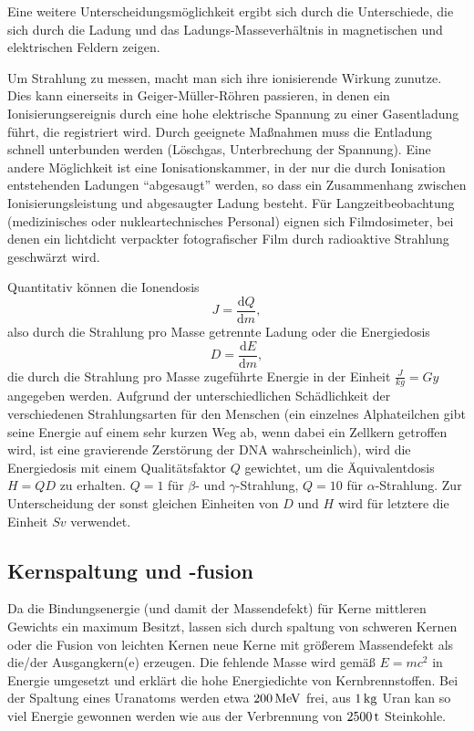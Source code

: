 \documentclass[a4paper]{scrartcl}
\begin{document}
Eine weitere Unterscheidungsmöglichkeit ergibt sich durch die Unterschiede, die sich durch die Ladung und das Ladungs-Masseverhältnis in magnetischen und elektrischen Feldern zeigen.

Um Strahlung zu messen, macht man sich ihre ionisierende Wirkung zunutze. Dies kann einerseits in Geiger-Müller-Röhren passieren, in denen ein Ionisierungsereignis durch eine hohe elektrische Spannung zu einer Gasentladung führt, die registriert wird. Durch geeignete Maßnahmen muss die Entladung schnell unterbunden werden (Löschgas, Unterbrechung der Spannung). Eine andere Möglichkeit ist eine Ionisationskammer, in der nur die durch Ionisation entstehenden Ladungen "`abgesaugt"' werden, so dass ein Zusammenhang zwischen Ionisierungsleistung und abgesaugter Ladung besteht. Für Langzeitbeobachtung (medizinisches oder nukleartechnisches Personal) eignen sich Filmdosimeter, bei denen ein lichtdicht verpackter fotografischer Film durch radioaktive Strahlung geschwärzt wird.

Quantitativ können die Ionendosis
\begin{equation*}
  J = \frac{\text{d}Q}{\text{d}m},
\end{equation*}
also durch die Strahlung pro Masse getrennte Ladung oder die Energiedosis
\begin{equation*}
  D = \frac{\text{d}E}{\text{d}m},
\end{equation*}
die durch die Strahlung pro Masse zugeführte Energie in der Einheit $\unit{\frac{J}{kg}} = \unit{Gy}$ angegeben werden. Aufgrund der unterschiedlichen Schädlichkeit der verschiedenen Strahlungsarten für den Menschen (ein einzelnes Alphateilchen gibt seine Energie auf einem sehr kurzen Weg ab, wenn dabei ein Zellkern getroffen wird, ist eine gravierende Zerstörung der DNA wahrscheinlich), wird die Energiedosis mit einem Qualitätsfaktor $Q$ gewichtet, um die Äquivalentdosis $H = QD$ zu erhalten. $Q=1$ für $\beta$- und $\gamma$-Strahlung, $Q=10$ für $\alpha$-Strahlung. Zur Unterscheidung der sonst gleichen Einheiten von $D$ und $H$ wird für letztere die Einheit $\unit{Sv}$ verwendet.

\subsection{Kernspaltung und -fusion}
Da die Bindungsenergie (und damit der Massendefekt) für Kerne mittleren Gewichts ein maximum Besitzt, lassen sich durch spaltung von schweren Kernen oder die Fusion von leichten Kernen neue Kerne mit größerem Massendefekt als die/der Ausgangkern(e) erzeugen. Die fehlende Masse wird gemäß $E=mc^2$ in Energie umgesetzt und erklärt die hohe Energiedichte von Kernbrennstoffen. Bei der Spaltung eines Uranatoms werden etwa $\unit[200]{MeV}$ frei, aus $\unit[1]{kg}$ Uran kan so viel Energie gewonnen werden wie aus der Verbrennung von $\unit[2500]{t}$ Steinkohle.
\end{document}
